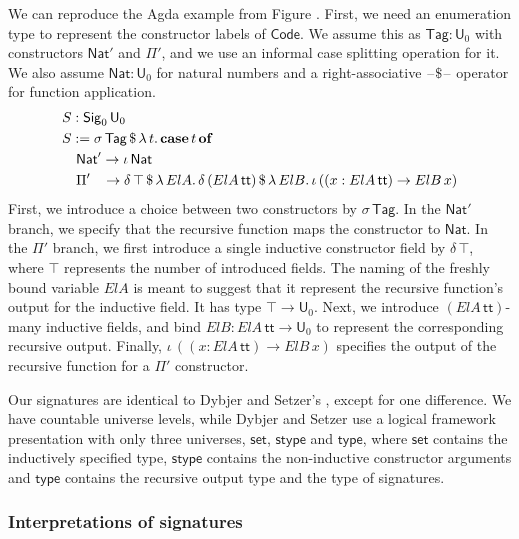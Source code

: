 \documentclass[acmsmall,screen,review,anonymous]{acmart}
\newcommand{\msf}[1]{{\mathsf{#1}}}
\newcommand{\mbf}[1]{{\mathbf{#1}}}
\newcommand{\U}{\msf{U}}
\newcommand{\Nat}{\msf{Nat}}
\newcommand{\Sig}{\msf{Sig}}
\newcommand{\Code}{\msf{Code}}
\newcommand{\Tag}{\msf{Tag}}
\newcommand{\case}{\mbf{case}}
\newcommand{\of}{\mbf{of}}
\newcommand{\ttt}{\msf{tt}}
\newcommand{\blank}{{\mathord{\hspace{1pt}\text{--}\hspace{1pt}}}}
\begin{document}
\begin{example}
We can reproduce the Agda example from Figure \cite{TODO}. First, we need an enumeration type to
represent the constructor labels of $\Code$. We assume this as $\Tag : \U_0$ with constructors
$\Nat'$ and $\Pi'$, and we use an informal case splitting operation for it. We also assume $\Nat :
\U_0$ for natural numbers and a right-associative $\blank\!\$\!\blank$ operator for function application.
\begin{alignat*}{4}
  & S : \Sig_0\,\U_0\\
  & S := \sigma\,\Tag\,\$\,\lambda\,t.\,\case\,t\,\of \\
  & \quad \Nat' \to \iota\,\Nat \\
  & \quad \Pi'\hspace{0.85em} \to \delta\,\top\,\$\,\lambda\,{ElA}.\, \delta\,({ElA}\,\ttt)\,\$\,\lambda\,{ElB}.\,
      \iota\, ((x : {ElA}\,\ttt) \to {ElB}\,x)
\end{alignat*}
First, we introduce a choice between two constructors by $\sigma\,\Tag$. In the $\Nat'$ branch, we
specify that the recursive function maps the constructor to $\Nat$. In the $\Pi'$ branch, we first
introduce a single inductive constructor field by $\delta\,\top$, where $\top$ represents the number
of introduced fields. The naming of the freshly bound variable ${ElA}$ is meant to suggest that it
represent the recursive function's output for the inductive field. It has type $\top \to \U_0$.
Next, we introduce $({ElA}\,\ttt)$-many inductive fields, and bind ${ElB} : {ElA}\,\ttt \to \U_0$ to
represent the corresponding recursive output. Finally, $\iota\, ((x : {ElA}\,\ttt) \to {ElB}\,x)$
specifies the output of the recursive function for a $\Pi'$ constructor.
\end{example}

Our signatures are identical to Dybjer and Setzer's \cite{TODO}, except for one difference.  We have
countable universe levels, while Dybjer and Setzer use a logical framework presentation with only
three universes, $\msf{set}$, $\msf{stype}$ and $\msf{type}$, where $\msf{set}$ contains the
inductively specified type, $\msf{stype}$ contains the non-inductive constructor arguments and
$\msf{type}$ contains the recursive output type and the type of signatures.

\subsubsection{Interpretations of signatures}\label{sec:signature-semantics}
\end{document}
